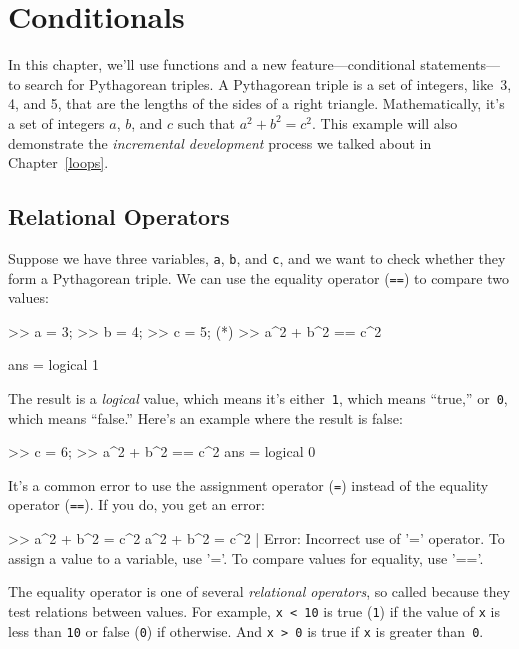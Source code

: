 \chapter{Conditionals}


In this chapter, we'll use functions and a new feature---conditional statements---to search for Pythagorean triples.
A Pytha\-gorean triple is a set of integers, like~3, 4, and 5,
that are the lengths of the sides of a right triangle.  Mathematically, it's a set of integers $a$, $b$, and $c$ such that $a^2 + b^2 = c^2$.
This example will also demonstrate the \emph{incremental development} process we talked about in Chapter~\ref{loops}.


\section{Relational Operators}

Suppose we have three variables, \lstinline{a}, \lstinline{b}, and \lstinline{c}, and we want to check whether they form a Pythagorean triple.  We can use the equality operator (\lstinline{==}) to compare two values:

\begin{code}
>> a = 3;
>> b = 4;
>> c = 5;
(*\pagebreak*)
>> a^2 + b^2 == c^2

ans = logical 1
\end{code}

The result is a \emph{logical} value, which means it's either~\lstinline{1}, which means ``true,'' or~\lstinline{0}, which means ``false.''  Here's an example where the result is false:

\begin{code}
>> c = 6;
>> a^2 + b^2 == c^2
ans = logical 0
\end{code}

It's a common error to use the assignment operator (\lstinline{=}) instead of the equality operator (\lstinline{==}).  If you do, you get an error:

\begin{code}
>> a^2 + b^2 = c^2
 a^2 + b^2 = c^2
           |
Error: Incorrect use of '=' operator.
To assign a value to a variable, use '='.
To compare values for equality, use '=='.
\end{code}

The equality operator is one of several \emph{relational operators}, so called because they test relations between values.
For example, \lstinline{x < 10} is true (\lstinline{1}) if the value of \lstinline{x} is less than \lstinline{10} or false (\lstinline{0}) if otherwise.  And \lstinline{x > 0} is true if \lstinline{x} is greater than~\lstinline{0}.

